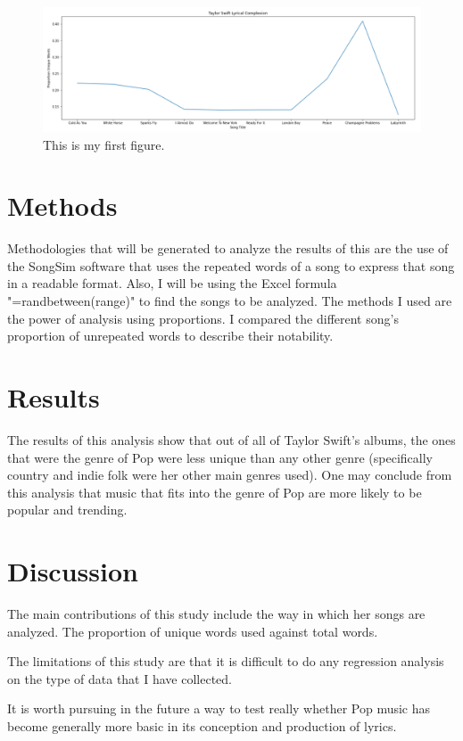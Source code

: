 \documentclass[12pt]{article}
\begin{document}
\begin{figure}[htbp]
  \centering
  \includegraphics[width=\textwidth]{graph.png}
  \caption{This is my first figure.}
  \label{fig:graph}
\end{figure}



\section{Methods}
\label{sec:meth}

Methodologies that will be generated to analyze the results of this are the use of the SongSim software that uses the repeated words of a song to express that song in a readable format. Also, I will be using the Excel formula "=randbetween(range)" to find the songs to be analyzed. The methods I used are the power of analysis using proportions. I compared the different song's proportion of unrepeated words to describe their notability. 


\section{Results}
\label{sec:resu}
The results of this analysis show that out of all of Taylor Swift's albums, the ones that were the genre of Pop were less unique than any other genre (specifically country and indie folk were her other main genres used). One may conclude from this analysis that music that fits into the genre of Pop are more likely to be popular and trending. 



\section{Discussion}
\label{sec:disc}

The main contributions of this study include the way in which her songs are analyzed. The proportion of unique words used against total words. 

The limitations of this study are that it is difficult to do any regression analysis on the type of data that I have collected. 

It is worth pursuing in the future a way to test really whether Pop music has become generally more basic in its conception and production of lyrics. 




\end{document}
